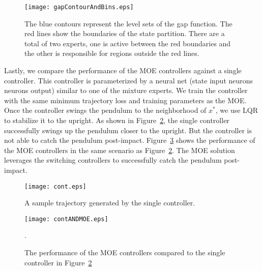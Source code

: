 \begin{figure}[H]
    \centering
    \texttt{[image: gapContourAndBins.eps]}
    \caption{The blue contours represent the level sets of the gap function. The red lines show the boundaries of the state partition. There are a total of two experts, one is active between the red boundaries and the other is responsible for regions outside the red lines.}
    \label{fig:gapContour}
\end{figure}


Lastly, we compare the performance of the MOE controllers against a single controller.
%
This controller is parameterized by a neural net (state input 
neurons  neurons  output) similar to one of the
mixture experts.
%
We train the controller with the same minimum trajectory loss and training
parameters as the MOE.
%
Once the controller swings the pendulum to the neighborhood of $x^*$, we use LQR
to stabilize it to the upright.
%
As shown in Figure~\ref{fig:continuous_control}, the single controller
successfully swings up the pendulum closer to the upright.
%
But the controller is not able to catch the pendulum post-impact.
%
Figure~\ref{fig:contandmoe} shows the performance of the MOE controllers in the
same scenario as Figure~\ref{fig:continuous_control}.
%
The MOE solution leverages the switching controllers to successfully catch the
pendulum post-impact.
%

\begin{figure}[t]
    \centering
    \texttt{[image: cont.eps]}
    \caption{A sample trajectory generated by the single controller. }
    \label{fig:continuous_control}
\end{figure}

\begin{figure}[H]
    \centering
    \texttt{[image: contANDMOE.eps]}
    \caption{The performance of the MOE controllers compared to the single
    controller in Figure~\ref{fig:continuous_control}}.
    \label{fig:contandmoe}
\end{figure}
